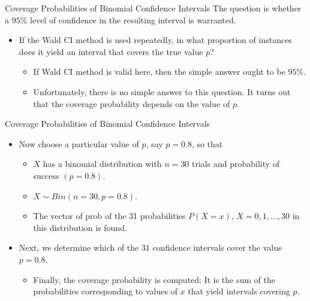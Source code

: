 \documentclass[
  ignorenonframetext,
]{beamer}
\providecommand{\tightlist}{%
  \setlength{\itemsep}{0pt}\setlength{\parskip}{0pt}}
\begin{document}
\begin{frame}{Coverage Probabilities of Binomial Confidence Intervals}
\protect\hypertarget{coverage-probabilities-of-binomial-confidence-intervals-1}{}
The question is whether a \(95\%\) level of confidence in the resulting
interval is warranted.

\begin{itemize}
\item
  If the Wald CI method is used repeatedly, in what proportion of
  instances does it yield an interval that covers the true value \(p\)?

  \begin{itemize}
  \tightlist
  \item
    If Wald CI method is valid here, then the simple answer ought to be
    \(95\%\).
  \item
    Unfortunately, there is no simple answer to this question. It turns
    out that the coverage probability depends on the value of \(p\).
  \end{itemize}
\end{itemize}
\end{frame}

\begin{frame}{Coverage Probabilities of Binomial Confidence Intervals}
\protect\hypertarget{coverage-probabilities-of-binomial-confidence-intervals-2}{}
\begin{itemize}
\item
  Now choose a particular value of \(p\), say \(p=0.8\), so that

  \begin{itemize}
  \tightlist
  \item
    \(X\) has a binomial distribution with \(n=30\) trials and
    probability of success \((p=0.8)\).
  \item
    \(X\sim Bin(n=30, p=0.8)\).
  \item
    The vector of prob of the 31 probabilities \(P(X=x)\),
    \(X=0, 1, \ldots, 30\) in this distribution is found.
  \end{itemize}
\item
  Next, we determine which of the 31 confidence intervals cover the
  value \(p=0.8\).

  \begin{itemize}
  \tightlist
  \item
    Finally, the coverage probability is computed: It is the sum of the
    probabilities corresponding to values of \(x\) that yield intervals
    covering \(p\).
  \end{itemize}
\end{itemize}
\end{frame}
\end{document}
